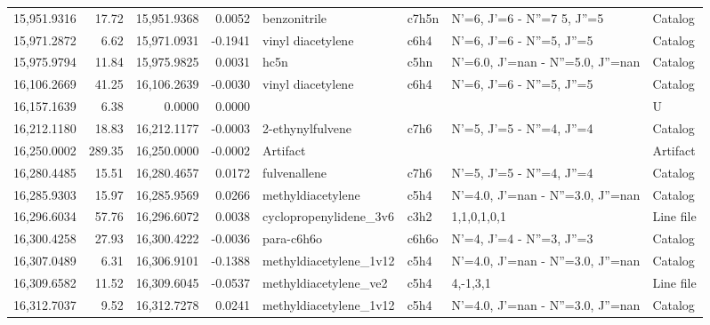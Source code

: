 \begin{longtable}{rrrrllll}
15,951.9316 &     17.72 &       15,951.9368 &    0.0052 &                benzonitrile &   c7h5n &      N'=6, J'=6 - N''=7     5, J''=5 &    Catalog \\
15,971.2872 &      6.62 &       15,971.0931 &   -0.1941 &           vinyl diacetylene &    c6h4 &            N'=6, J'=6 - N''=5, J''=5 &    Catalog \\
15,975.9794 &     11.84 &       15,975.9825 &    0.0031 &                        hc5n &    c5hn &    N'=6.0, J'=nan - N''=5.0, J''=nan &    Catalog \\
16,106.2669 &     41.25 &       16,106.2639 &   -0.0030 &           vinyl diacetylene &    c6h4 &            N'=6, J'=6 - N''=5, J''=5 &    Catalog \\
16,157.1639 &      6.38 &            0.0000 &    0.0000 &                             &         &                                      &          U \\
16,212.1180 &     18.83 &       16,212.1177 &   -0.0003 &            2-ethynylfulvene &    c7h6 &            N'=5, J'=5 - N''=4, J''=4 &    Catalog \\
16,250.0002 &    289.35 &       16,250.0000 &   -0.0002 &                    Artifact &         &                                      &   Artifact \\
16,280.4485 &     15.51 &       16,280.4657 &    0.0172 &                fulvenallene &    c7h6 &            N'=5, J'=5 - N''=4, J''=4 &    Catalog \\
16,285.9303 &     15.97 &       16,285.9569 &    0.0266 &           methyldiacetylene &    c5h4 &    N'=4.0, J'=nan - N''=3.0, J''=nan &    Catalog \\
16,296.6034 &     57.76 &       16,296.6072 &    0.0038 &      cyclopropenylidene_3v6 &    c3h2 &                          1,1,0,1,0,1 &  Line file \\
16,300.4258 &     27.93 &       16,300.4222 &   -0.0036 &                  para-c6h6o &   c6h6o &            N'=4, J'=4 - N''=3, J''=3 &    Catalog \\
16,307.0489 &      6.31 &       16,306.9101 &   -0.1388 &      methyldiacetylene_1v12 &    c5h4 &    N'=4.0, J'=nan - N''=3.0, J''=nan &    Catalog \\
16,309.6582 &     11.52 &       16,309.6045 &   -0.0537 &       methyldiacetylene_ve2 &    c5h4 &                             4,-1,3,1 &  Line file \\
16,312.7037 &      9.52 &       16,312.7278 &    0.0241 &      methyldiacetylene_1v12 &    c5h4 &    N'=4.0, J'=nan - N''=3.0, J''=nan &    Catalog \\

\end{longtable}
